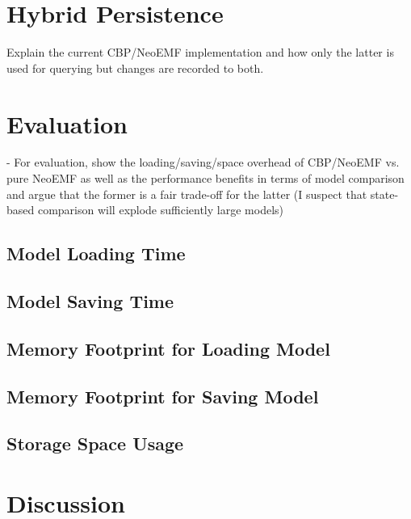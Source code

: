 \documentclass[10pt,conference]{IEEEtran}
\begin{document}
\section{Hybrid Persistence}
\label{sec:hybrid_persistence}
Explain the current CBP/NeoEMF implementation and how only the latter is used for querying but changes are recorded to both.




\section{Evaluation}
\label{sec:evaluation}
- For evaluation, show the loading/saving/space overhead of CBP/NeoEMF
vs. pure NeoEMF as well as the performance benefits in terms of model
comparison and argue that the former is a fair trade-off for the
latter (I suspect that state-based comparison will explode
sufficiently large models)

\subsection{Model Loading Time}
\label{sec:model_loading_time}

\subsection{Model Saving Time}
\label{sec:model_saving_time}

\subsection{Memory Footprint for Loading Model}
\label{sec:memory_footprint_for_loading_model}

\subsection{Memory Footprint for Saving Model}
\label{sec:memory_footprint_for_saving_model}

\subsection{Storage Space Usage}
\label{sec:storage_space_usage}

\section{Discussion}
\label{sec:discussion}
\end{document}
